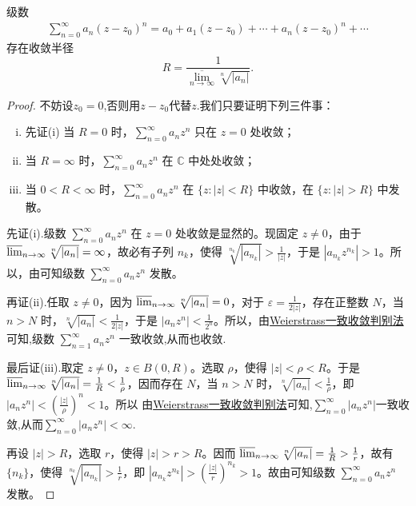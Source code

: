 \documentclass[../../main.tex]{subfiles}%
\begin{document}
\begin{theorem}\label{theorem:Cauchy-Hadamard收敛半径公式}
级数\begin{align*}
\sum_{n=0}^{\infty} a_n(z - z_0)^n = a_0 + a_1(z - z_0) + \cdots  + a_n(z - z_0)^n + \cdots 
\end{align*}
存在收敛半径
\[
R=\frac{1}{\underset{n\rightarrow \infty}{\overline{\lim }}\sqrt[n]{|a_n|}}.
\]
\end{theorem}
\begin{proof}

不妨设$z_0=0$,否则用$z-z_0$代替$z$.我们只要证明下列三件事：
\begin{enumerate}[(i)]
\item 先证(i) 当 \( R = 0 \) 时，\( \sum_{n=0}^{\infty} a_n z^n \) 只在 \( z = 0 \) 处收敛；

\item 当 \( R = \infty \) 时，\( \sum_{n=0}^{\infty} a_n z^n \) 在 \( \mathbb{C} \) 中处处收敛；

\item 当 \( 0 < R < \infty \) 时，\( \sum_{n=0}^{\infty} a_n z^n \) 在 \( \{z : |z| < R\} \) 中收敛，在 \( \{z : |z| > R\} \) 中发散。
\end{enumerate}
先证(i).级数 \( \sum_{n=0}^{\infty} a_n z^n \) 在 \( z = 0 \) 处收敛是显然的。现固定 \( z \neq 0 \)，由于 \( \varlimsup_{n \to \infty} \sqrt[n]{|a_n|} = \infty \)，故必有子列 \( n_k \)，使得 \( \sqrt[n_k]{|a_{n_k}|} > \frac{1}{|z|} \)，于是 \( |a_{n_k} z^{n_k}| > 1 \)。所以，由可知级数 \( \sum_{n=0}^{\infty} a_n z^n \) 发散。

再证(ii).任取 \( z \neq 0 \)，因为 \( \varlimsup_{n \to \infty} \sqrt[n]{|a_n|} = 0 \)，对于 \( \varepsilon = \frac{1}{2|z|} \)，存在正整数 \( N \)，当 \( n > N \) 时，\( \sqrt[n]{|a_n|} < \frac{1}{2|z|} \)，于是 \( |a_n z^n| < \frac{1}{2^n} \)。所以，由\hyperref[theorem:Weierstrass一致收敛判别法]{Weierstrass一致收敛判别法}可知,级数 \( \sum_{n=1}^{\infty} a_n z^n \) 一致收敛,从而也收敛.

最后证(iii).取定 \( z \neq 0 \)，\( z \in B(0, R) \)。选取 \( \rho \)，使得 \( |z| < \rho < R \)。于是 \( \varlimsup_{n \to \infty} \sqrt[n]{|a_n|} = \frac{1}{R} < \frac{1}{\rho} \)，因而存在 \( N \)，当 \( n > N \) 时，\( \sqrt[n]{|a_n|} < \frac{1}{\rho} \)，即 \( |a_n z^n| < \left( \frac{|z|}{\rho} \right)^n<1 \)。所以 由\hyperref[theorem:Weierstrass一致收敛判别法]{Weierstrass一致收敛判别法}可知,\( \sum_{n=0}^{\infty} |a_n z^n|\)一致收敛,从而\( \sum_{n=0}^{\infty} |a_n z^n| < \infty \).

再设 \( |z| > R \)，选取 \( r \)，使得 \( |z| > r > R \)。因而 \( \varlimsup_{n \to \infty} \sqrt[n]{|a_n|} = \frac{1}{R} > \frac{1}{r} \)，故有 \( \{n_k\} \)，使得 \( \sqrt[n_k]{|a_{n_k}|} > \frac{1}{r} \)，即 \( |a_{n_k} z^{n_k}| > \left( \frac{|z|}{r} \right)^{n_k} > 1 \)。故由可知级数 \( \sum_{n=0}^{\infty} a_n z^n \) 发散。

\end{proof}
\end{document}
